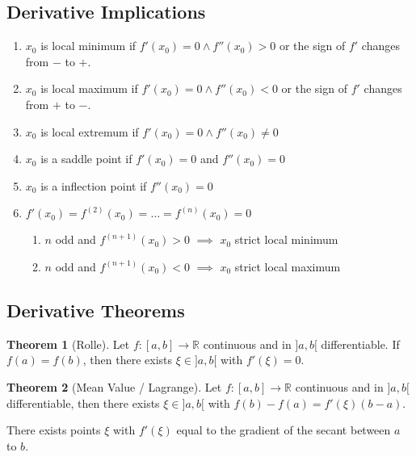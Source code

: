 \documentclass[a4paper, 10pt]{article}
\theoremstyle{definition}
\theoremstyle{named}
\newtheorem*{ntheorem_wrapper}{Theorem}
\newenvironment{ntheorem}%
    {\begin{mdframed}[style=important]\begin{ntheorem_wrapper}}%
    {\end{ntheorem_wrapper}\end{mdframed}}
\newcommand{\R}{\mathbb{R}}
\begin{document}
\subsection{Derivative Implications}
\begin{enumerate}
    \item $x_0$ is local minimum if $f'(x_0) = 0 \land f''(x_0) > 0$ or the sign of $f'$ changes from $-$ to $+$.
    \item $x_0$ is local maximum if $f'(x_0) = 0 \land f''(x_0) < 0$ or the sign of $f'$ changes from $+$ to $-$.
    \item $x_0$ is local extremum if $f'(x_0) = 0 \land f''(x_0) \neq 0$
    \item $x_0$ is a saddle point if $f'(x_0) = 0$ and $f''(x_0) = 0$
    \item $x_0$ is a inflection point if $f''(x_0) = 0$
    \item $f'(x_0) = f^{(2)}(x_0) = \ldots = f^{(n)}(x_0) = 0$
    \begin{enumerate}
        \item $n$ odd and $f^{(n+1)}(x_0) > 0$ $\implies$ $x_0$ strict local minimum
        \item $n$ odd and $f^{(n+1)}(x_0) < 0$ $\implies$ $x_0$ strict local maximum
    \end{enumerate}
\end{enumerate}

\subsection{Derivative Theorems}
\begin{ntheorem}[Rolle]
    Let $f: [a, b] \to \R$ continuous and in $]a, b[$ differentiable. If $f(a) = f(b)$, then there exists $\xi \in ]a, b[$ with $f'(\xi) = 0$.
\end{ntheorem}

\begin{ntheorem}[Mean Value / Lagrange]
    Let $f: [a, b] \to \R$ continuous and in $]a, b[$ differentiable, then there exists $\xi \in ]a, b[$ with $f(b) - f(a) = f'(\xi)(b-a)$.

    There exists points $\xi$ with $f'(\xi)$ equal to the gradient of the secant between $a$ to $b$.
\end{ntheorem}
\end{document}
